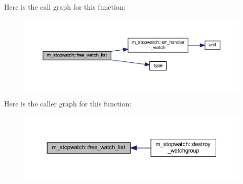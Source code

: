 Here is the call graph for this function\+:
\nopagebreak
\begin{figure}[H]
\begin{center}
\leavevmode
\includegraphics[width=350pt]{namespacem__stopwatch_a5b5053a6d9b4a5c8395c25510fb99790_cgraph}
\end{center}
\end{figure}
Here is the caller graph for this function\+:
\nopagebreak
\begin{figure}[H]
\begin{center}
\leavevmode
\includegraphics[width=350pt]{namespacem__stopwatch_a5b5053a6d9b4a5c8395c25510fb99790_icgraph}
\end{center}
\end{figure}
\mbox{\label{namespacem__stopwatch_a16430afb6979f137951c6d572903e5c5}} 
